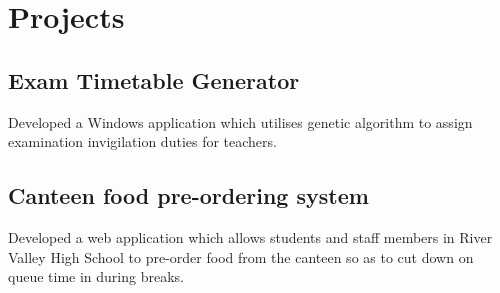 \documentclass[a4paper,hidelinks]{resume} %
\begin{document}
\begin{minipage}[t]{0.45\textwidth}
    \section{Projects}
    
    \sectionspace %
    
    
    \subsection{Exam Timetable Generator}
    
    Developed a Windows application which utilises genetic algorithm to assign examination invigilation duties for teachers.
    
    \sectionspace %
    
    \subsection{Canteen food pre-ordering system}

    Developed a web application which allows students and staff members in River Valley High School to pre-order food from the canteen so as to cut down on queue time in during breaks.
    
    \sectionspace %


\end{minipage} %
\hfill
%
%
\end{document}
